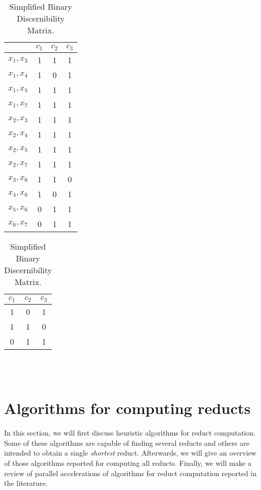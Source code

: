 \documentclass[citenumber]{llncs}
\begin{document}
    \begin{table}[htb]
    \centering
        \begin{minipage}[b]{0.49\hsize}\centering
  		\caption{Binary Discernibility Matrix.} \label{tab_BDM}
   		\begin{tabular}{cccc}
	   		& $c_1$ & $c_2$ & $c_3$\\
	   		\hline
	  		$x_1,x_3$ & 1 & 1 & 1 \\
	  		$x_1,x_4$ & 1 & 0 & 1 \\
	  		$x_1,x_5$ & 1 & 1 & 1 \\
	  		$x_1,x_7$ & 1 & 1 & 1 \\
	  		$x_2,x_3$ & 1 & 1 & 1 \\
	  		$x_2,x_4$ & 1 & 1 & 1 \\
	  		$x_2,x_5$ & 1 & 1 & 1 \\
	  		$x_2,x_7$ & 1 & 1 & 1 \\
	  		$x_3,x_6$ & 1 & 1 & 0 \\
	  		$x_4,x_6$ & 1 & 0 & 1 \\
	  		$x_5,x_6$ & 0 & 1 & 1 \\
	  		$x_6,x_7$ & 0 & 1 & 1 
	   	\end{tabular}             
    	\end{minipage}
 		\hfill
 		\begin{minipage}[b]{0.49\hsize}\centering
		\caption{Simplified Binary Discernibility Matrix.} \label{tab_SDM}
		\centering
	 	\begin{tabular}{ccc}
	 		$c_1$ & $c_2$ & $c_3$\\
	 		\hline
			1 & 0 & 1 \\
			1 & 1 & 0 \\
			0 & 1 & 1
	 	\end{tabular}   
	 	\bigskip \medskip \\~\\
	 	\end{minipage}  
 \end{table}
 
\section{Algorithms for computing reducts}\label{relatedWork}
  In this section, we will first discuss heuristic algorithms for reduct computation. Some of these algorithms are capable of finding several reducts and others are intended to obtain a single \textit{shortest} reduct. Afterwards, we will give an overview of those algorithms reported for computing all reducts. Finally, we will make a review of parallel accelerations of algorithms for reduct computation reported in the literature.  
  
\end{document}
